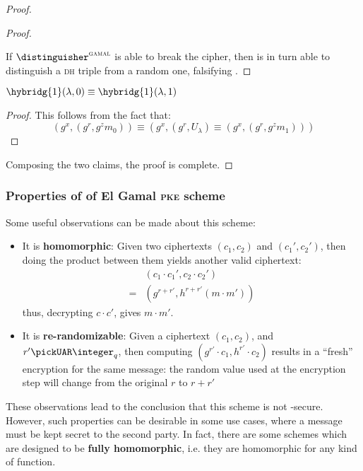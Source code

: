 \begin{proof}
\begin{proof}
\begin{cryptoredux}
        \end{cryptoredux}

        If $\distinguisher^{\textsc{gamal}}$ is able to break the cipher, then \adversary{} is in turn able to distinguish a \textsc{dh} triple from a random one, falsifying \ddh.
    \end{proof}

    \begin{claim}
        $\hybridg{1}(\lambda, 0) \equiv \hybridg{1}(\lambda, 1)$
    \end{claim}

    \begin{proof}
        This follows from the fact that:
        \[
            (g^x, (g^r, g^z m_0)) \equiv (g^x, (g^r, U_\lambda) \equiv (g^x, (g^r, g^z m_1)))
        \]
    \end{proof}
    
    Composing the two claims, the proof is complete.

\end{proof}

\subsubsection{Properties of of El Gamal \textsc{pke} scheme}

Some useful observations can be made about this scheme:
\begin{itemize}
    \item It is \textbf{homomorphic}: Given two ciphertexts $(c_1, c_2)$ and $(c_1', c_2')$, then doing the product between them yields another valid ciphertext:
    \begin{align*}
        & (c_1 \cdot c_1', c_2 \cdot c_2') \\
        =& (g^{r + r'}, h^{r + r'}(m \cdot m'))
    \end{align*}
    thus, decrypting $c \cdot c'$, gives $m \cdot m'$.
    
    \item It is \textbf{re-randomizable}: Given a ciphertext $(c_1, c_2)$, and $r' \pickUAR \integer_q$, then computing $(g^{r'} \cdot c_1, h^{r'} \cdot c_2)$ results in a ``fresh'' encryption for the same message: the random value used at the encryption step will change from the original $r$ to $r + r'$
\end{itemize}
These observations lead to the conclusion that this scheme is not \cca-secure. However, such properties can be desirable in some use cases, where a message must be kept secret to the second party. In fact, there are some \pke{} schemes which are designed to be \textbf{fully homomorphic}, i.e. they are homomorphic for any kind of function.

